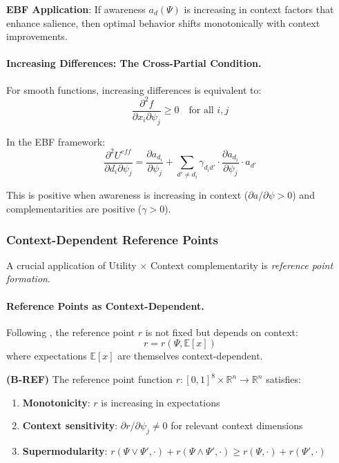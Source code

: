 \textbf{EBF Application}: If awareness $a_d(\Psi)$ is increasing in context 
factors that enhance salience, then optimal behavior shifts monotonically with 
context improvements.

\paragraph{Increasing Differences: The Cross-Partial Condition.}

For smooth functions, increasing differences is equivalent to:
\begin{equation}
\frac{\partial^2 f}{\partial x_i \partial \psi_j} \geq 0 \quad \text{for all } i, j
\end{equation}

In the EBF framework:
\begin{equation}
\frac{\partial^2 U^{eff}}{\partial d_i \partial \psi_j} = 
\frac{\partial a_{d_i}}{\partial \psi_j} + 
\sum_{d' \neq d_i} \gamma_{d_i d'} \cdot \frac{\partial a_{d_i}}{\partial \psi_j} \cdot a_{d'}
\end{equation}

This is positive when awareness is increasing in context ($\partial a / \partial \psi > 0$) 
and complementarities are positive ($\gamma > 0$).

\subsubsection{Context-Dependent Reference Points}

A crucial application of Utility $\times$ Context complementarity is 
\emph{reference point formation}.

\paragraph{Reference Points as Context-Dependent.}

Following \citet{PAP-koszegi2006model}, the reference point $r$ is not fixed but 
depends on context:
\begin{equation}
r = r(\Psi, \mathbb{E}[x])
\end{equation}
where expectations $\mathbb{E}[x]$ are themselves context-dependent.

\begin{axiom}
\label{ax:B-REF}
\textbf{(B-REF)} The reference point function $r: [0,1]^8 \times \mathbb{R}^n \to \mathbb{R}^n$ 
satisfies:
\begin{enumerate}
    \item \textbf{Monotonicity}: $r$ is increasing in expectations
    \item \textbf{Context sensitivity}: $\partial r / \partial \psi_j \neq 0$ for 
    relevant context dimensions
    \item \textbf{Supermodularity}: $r(\Psi \vee \Psi', \cdot) + r(\Psi \wedge \Psi', \cdot) 
    \geq r(\Psi, \cdot) + r(\Psi', \cdot)$
\end{enumerate}
\end{axiom}

